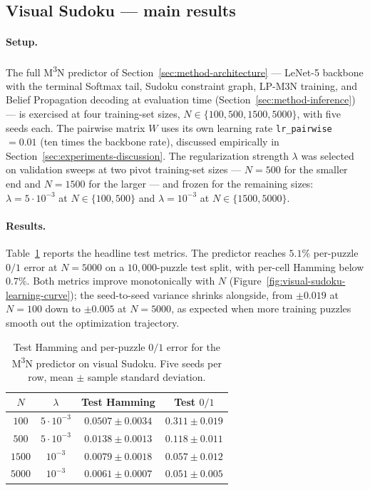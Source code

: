 \subsection{Visual Sudoku --- main results}
\label{subsec:experiments-sudoku-visual}

\paragraph{Setup.}
The full M\textsuperscript{3}N predictor of
Section~\ref{sec:method-architecture} --- LeNet-5 backbone with
the terminal Softmax tail, Sudoku constraint graph, LP-M3N
training, and Belief Propagation decoding at evaluation time
(Section~\ref{sec:method-inference}) --- is exercised at four
training-set sizes, $N \in \{100, 500, 1500, 5000\}$, with
five seeds each. The pairwise matrix $W$ uses its own learning
rate \texttt{lr\_pairwise} $= 0.01$ (ten times the backbone
rate), discussed empirically in
Section~\ref{sec:experiments-discussion}. The regularization
strength $\lambda$ was selected on validation sweeps at two
pivot training-set sizes --- $N = 500$ for the smaller end and
$N = 1500$ for the larger --- and frozen for the remaining
sizes: $\lambda = 5 \cdot 10^{-3}$ at $N \in \{100, 500\}$ and
$\lambda = 10^{-3}$ at $N \in \{1500, 5000\}$.

\paragraph{Results.}
Table~\ref{tab:visual-sudoku} reports the headline test metrics.
The predictor reaches $5.1\%$ per-puzzle $0/1$ error at
$N = 5000$ on a $10{,}000$-puzzle test split, with per-cell
Hamming below $0.7\%$. Both metrics improve monotonically with
$N$ (Figure~\ref{fig:visual-sudoku-learning-curve}); the
seed-to-seed variance shrinks alongside, from $\pm 0.019$ at
$N = 100$ down to $\pm 0.005$ at $N = 5000$, as expected when
more training puzzles smooth out the optimization trajectory.

\begin{table}[htbp]
\centering
\renewcommand{\arraystretch}{1.2}
\begin{tabular}{c c c c}
\hline
\textbf{$N$} & \textbf{$\lambda$} & \textbf{Test Hamming} & \textbf{Test $0/1$} \\
\hline
$100$  & $5 \cdot 10^{-3}$ & $0.0507 \pm 0.0034$ & $0.311 \pm 0.019$ \\
$500$  & $5 \cdot 10^{-3}$ & $0.0138 \pm 0.0013$ & $0.118 \pm 0.011$ \\
$1500$ & $10^{-3}$         & $0.0079 \pm 0.0018$ & $0.057 \pm 0.012$ \\
$5000$ & $10^{-3}$         & $0.0061 \pm 0.0007$ & $0.051 \pm 0.005$ \\
\hline
\end{tabular}
\caption[Visual Sudoku main results]{Test Hamming and
per-puzzle $0/1$ error for the M\textsuperscript{3}N predictor
on visual Sudoku. Five seeds per row, mean $\pm$ sample
standard deviation.}
\label{tab:visual-sudoku}
\end{table}

